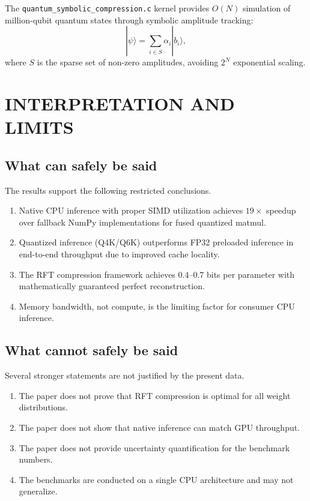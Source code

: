 \documentclass[aip,twocolumn,letterpaper]{revtex4}
\begin{document}
The \texttt{quantum\_symbolic\_compression.c} kernel provides \(O(N)\) simulation of million-qubit quantum states through symbolic amplitude tracking:
\begin{equation}
|\psi\rangle = \sum_{i \in S} \alpha_i |b_i\rangle,
\label{eq:quantum}
\end{equation}
where \(S\) is the sparse set of non-zero amplitudes, avoiding \(2^N\) exponential scaling.

\section{INTERPRETATION AND LIMITS}

\subsection{What can safely be said}

The results support the following restricted conclusions.

\begin{enumerate}
\item Native CPU inference with proper SIMD utilization achieves \(19\times\) speedup over fallback NumPy implementations for fused quantized matmul.
\item Quantized inference (Q4K/Q6K) outperforms FP32 preloaded inference in end-to-end throughput due to improved cache locality.
\item The RFT compression framework achieves 0.4--0.7 bits per parameter with mathematically guaranteed perfect reconstruction.
\item Memory bandwidth, not compute, is the limiting factor for consumer CPU inference.
\end{enumerate}

\subsection{What cannot safely be said}

Several stronger statements are not justified by the present data.

\begin{enumerate}
\item The paper does not prove that RFT compression is optimal for all weight distributions.
\item The paper does not show that native inference can match GPU throughput.
\item The paper does not provide uncertainty quantification for the benchmark numbers.
\item The benchmarks are conducted on a single CPU architecture and may not generalize.
\end{enumerate}
\end{document}
